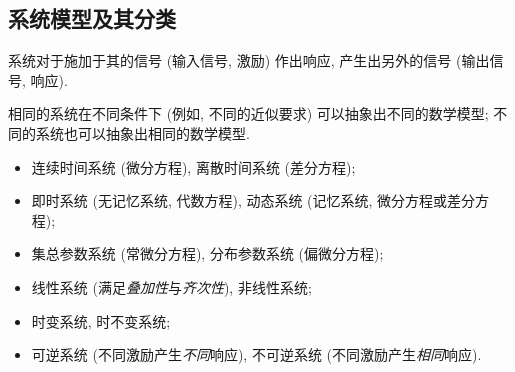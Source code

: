 \subsection{系统模型及其分类}

系统对于施加于其的信号 (输入信号, 激励) 作出响应, 产生出另外的信号 (输出信号, 响应).

相同的系统在不同条件下 (例如, 不同的近似要求) 可以抽象出不同的数学模型; 不同的系统也可以抽象出相同的数学模型.

\begin{itemize}
    \item 连续时间系统 (微分方程), 离散时间系统 (差分方程);
    \item 即时系统 (无记忆系统, 代数方程), 动态系统 (记忆系统, 微分方程或差分方程);
    \item 集总参数系统 (常微分方程), 分布参数系统 (偏微分方程);
    \item 线性系统 (满足\textit{叠加性}与\textit{齐次性}), 非线性系统;
    \item 时变系统, 时不变系统;
    \item 可逆系统 (不同激励产生\textit{不同}响应), 不可逆系统 (不同激励产生\textit{相同}响应).
\end{itemize}
